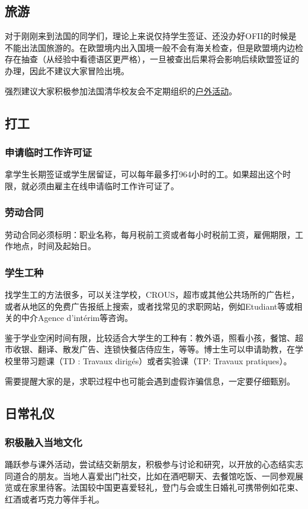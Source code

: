 \subsection{旅游}
对于刚刚来到法国的同学们，理论上来说仅持学生签证、还没办好OFII的时候是不能出法国旅游的。在欧盟境内出入国境一般不会有海关检查，但是欧盟境内边检存在抽查（从经验中看德语区更严格），一旦被查出后果将会影响后续欧盟签证的办理，因此不建议大家冒险出境。

强烈建议大家积极参加法国清华校友会不定期组织的\href{https://www.tsinghua-france.org/category/activities/outdoor/}{户外活动}。

\subsection{打工}
\subsubsection{申请临时工作许可证}
拿学生长期签证或学生居留证，可以每年最多打964小时的工。如果超出这个时限，就必须由雇主在线申请临时工作许可证了。

\subsubsection{劳动合同}
劳动合同必须标明：职业名称，每月税前工资或者每小时税前工资，雇佣期限，工作地点，时间及起始日。

\subsubsection{学生工种}
找学生工的方法很多，可以关注学校，CROUS，超市或其他公共场所的广告栏，或者从地区的免费广告报纸上搜索，或者找常见的求职⽹站，例如Etudiant等或相关的中介Agence d’intérim等咨询。

鉴于学业空闲时间有限，比较适合大学生的工种有：教外语，照看小孩，餐馆、超市收银、翻译、散发广告、连锁快餐店侍应生，等等。博士生可以申请助教，在学校里带习题课（TD : Travaux dirigés）或者实验课（TP: Travaux pratiques）。

需要提醒⼤家的是，求职过程中也可能会遇到虚假诈骗信息，⼀定要仔细甄别。

\subsection{日常礼仪}
\subsubsection{积极融入当地文化}
踊跃参与课外活动，尝试结交新朋友，积极参与讨论和研究，以开放的心态结实志同道合的朋友。当地人喜爱出门社交，比如在酒吧聊天、去餐馆吃饭、一同参观展览或在家里待客。法国较中国更喜爱轻礼，登门与会或生日婚礼可携带例如花束、红酒或者巧克力等伴手礼。

